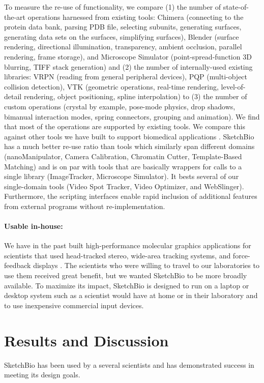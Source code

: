 \documentclass[twocolumn]{bmcart}%
\begin{document}
To measure the re-use of functionality, we compare (1) the number of state-of-the-art operations harnessed from existing tools: Chimera (connecting to the protein data bank, parsing PDB file, selecting subunits, generating surfaces, generating data sets on the surfaces, simplifying surfaces), Blender (surface rendering, directional illumination, transparency, ambient occlusion, parallel rendering, frame storage), and Microscope Simulator (point-spread-function 3D blurring, TIFF stack generation) and (2) the number of internally-used existing libraries: VRPN (reading from general peripheral devices), PQP (multi-object collision detection), VTK (geometric operations, real-time rendering, level-of-detail rendering, object positioning, spline interpolation) to (3) the number of custom operations (crystal by example, pose-mode physics, drop shadows, bimanual interaction modes, spring connectors, grouping and animation).  We find that most of the operations are supported by existing tools.
We compare this against other tools we have built to support biomedical applications \cite{CISMMapps}. SketchBio has a much better re-use ratio than tools which similarly span different domains (nanoManipulator, Camera Calibration, Chromatin Cutter, Template-Based Matching) and is on par with tools that are basically wrappers for calls to a single library (ImageTracker, Microscope Simulator).  It bests several of our single-domain tools (Video Spot Tracker, Video Optimizer, and WebSlinger).
Furthermore, the scripting interfaces enable rapid inclusion of additional features from external programs without re-implementation.

\paragraph*{Usable in-house:} We have in the past built high-performance molecular graphics applications for scientists that used head-tracked stereo, wide-area tracking systems, and force-feedback displays \cite{Arthur,Grant1998,Marshburn2005,Taylor1999,Taylor1997,Taylor1993}.
The scientists who were willing to travel to our laboratories to use them received great benefit, but we wanted SketchBio to be more broadly available.
To maximize its impact, SketchBio is designed to run on a laptop or desktop system such as a scientist would have at home or in their laboratory and to use inexpensive commercial input devices.

\section*{Results and Discussion}
SketchBio has been used by a several scientists and has demonstrated success in meeting its design goals.
\end{document}
